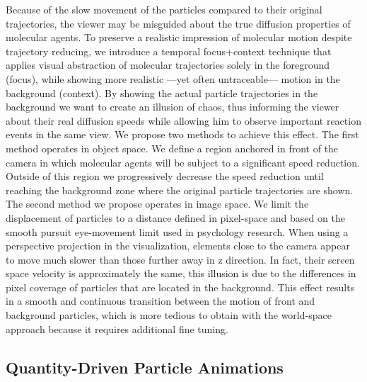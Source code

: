 Because of the slow movement of the particles compared to their original trajectories, the viewer may be misguided about the true diffusion properties of molecular agents.
To preserve a realistic impression of molecular motion despite trajectory reducing, we introduce a temporal focus+context technique that applies visual abstraction of molecular trajectories solely in the foreground (focus), while showing more realistic ---yet often untraceable--- motion in the background (context).
By showing the actual particle trajectories in the background we want to create an illusion of chaos, thus informing the viewer about their real diffusion speeds while allowing him to observe important reaction events in the same view.
We propose two methods to achieve this effect.
The first method operates in object space.
We define a region anchored in front of the camera in which molecular agents will be subject to a significant speed reduction.
Outside of this region we progressively decrease the speed reduction until reaching the background zone where the original particle trajectories are shown.
The second method we propose operates in image space.
We limit the displacement of particles to a distance defined in pixel-space and based on the smooth pursuit eye-movement limit used in psychology research.
When using a perspective projection in the visualization, elements close to the camera appear to move much slower than those further away in z direction. 
In fact, their screen space velocity is approximately the same, this illusion is due to the differences in pixel coverage of particles that are located in the background.
This effect results in a smooth and continuous transition between the motion of front and background particles, which is more tedious to obtain with the world-space approach because it requires additional fine tuning.

\subsection{Quantity-Driven Particle Animations}

